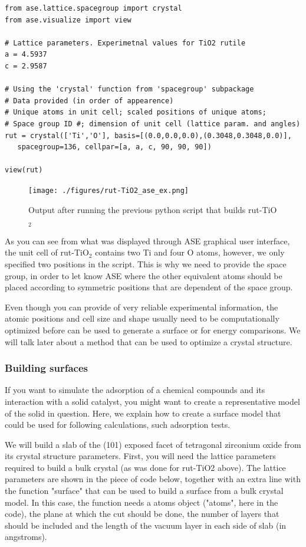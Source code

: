 \documentclass[11pt]{article}
\begin{document}
\begin{verbatim}
from ase.lattice.spacegroup import crystal
from ase.visualize import view

# Lattice parameters. Experimetnal values for TiO2 rutile
a = 4.5937
c = 2.9587

# Using the 'crystal' function from 'spacegroup' subpackage
# Data provided (in order of appearence)
# Unique atoms in unit cell; scaled positions of unique atoms;
# Space group ID #; dimension of unit cell (lattice param. and angles)
rut = crystal(['Ti','O'], basis=[(0.0,0.0,0.0),(0.3048,0.3048,0.0)],
   spacegroup=136, cellpar=[a, a, c, 90, 90, 90])

view(rut)
\end{verbatim}

\begin{figure}[htb]
\centering
\texttt{[image: ./figures/rut-TiO2\_ase\_ex.png]}
\caption{Output after running the previous python script that builds rut-TiO$_{\text{2}}$}
\end{figure}

As you can see from what was displayed through ASE graphical user interface, the unit cell of rut-TiO$_{\text{2}}$ contains two Ti and four O atoms, however, we only specified two positions in the script. This is why we need to provide the space group, in order to let know ASE where the other equivalent atoms should be placed according to symmetric positions that are dependent of the space group.

Even though you can provide of very reliable experimental information, the atomic positions and cell size and shape usually need to be computationally optimized before can be used to generate a surface or for energy comparisons. We will talk later about a method that can be used to optimize a crystal structure.  

\subsubsection{Building surfaces}
\label{sec-5-0-5}
If you want to simulate the adsorption of a chemical compounds and its interaction with a solid catalyst, you might want to create a representative model of the solid in question. Here, we explain how to create a surface model that could be used for following calculations, such adsorption tests. 

We will build a slab of the (101) exposed facet of tetragonal zirconium oxide from its crystal structure parameters. First, you will need the lattice parameters required to build a bulk crystal (as was done for rut-TiO2 above). The lattice parameters are shown in the piece of code below, together with an extra line with the function "surface" that can be used to build a surface from a bulk crystal model. In this case, the function needs a atoms object ("atoms", here in the code), the plane at which the cut should be done, the number of layers that should be included and the length of the vacuum layer in each side of slab (in angstroms). 
\end{document}
